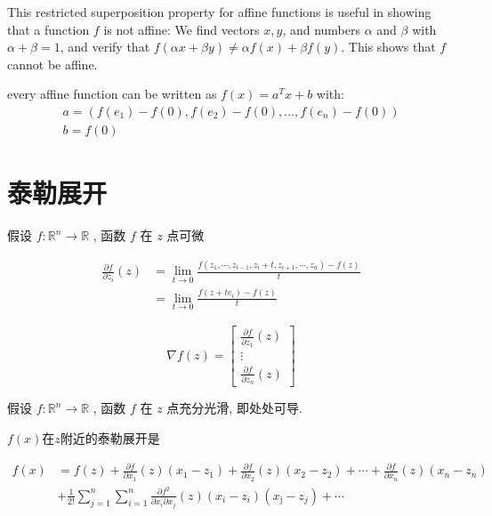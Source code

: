 \begin{corollary}
    This restricted superposition property for affine functions is useful in showing that a function $ f $ is not affine: We find vectors $ x, y $, and numbers $ \alpha $ and $ \beta $ with $ \alpha+\beta=1 $, and verify that $ f(\alpha x+\beta y) \neq \alpha f(x)+\beta f(y) . $ This shows that $ f $ cannot be affine.
\end{corollary}

\begin{theorem}
    every affine function can be written as $ f(x)=a^{T} x+b $ with:
$$
\begin{array}{l}
a=\left(f\left(e_{1}\right)-f(0), f\left(e_{2}\right)-f(0), \ldots, f\left(e_{n}\right)-f(0)\right) \\
b=f(0)
\end{array}
$$

\end{theorem}


\section{泰勒展开}

\begin{definition}[函数$f$第$i$个分量的一阶偏导数]
    假设 $ f: \mathbb{R}^{n} \rightarrow \mathbb{R} $ , 函数 $ f $ 在 $ z $ 点可微

    $$ \begin{aligned} \frac{\partial f}{\partial z_{i}}(z) &=\lim _{t \rightarrow 0} \frac{f\left(z_{1}, \cdots, z_{i-1}, z_{i}+t, z_{i+1}, \cdots, z_{n}\right)-f(z)}{t} \\ &=\lim _{t \rightarrow 0} \frac{f\left(z+t e_{i}\right)-f(z)}{t} \end{aligned} $$
\end{definition}

\begin{definition}[$f$在点$z$的梯度]
    $$ \nabla f(z)=\left[\begin{array}{c}\frac{\partial f}{\partial z_{1}}(z) \\ \vdots \\ \frac{\partial f}{\partial z_{n}}(z)\end{array}\right] $$
\end{definition}

\begin{definition}
    假设 $ f: \mathbb{R}^{n} \rightarrow \mathbb{R} $ , 函数 $ f $ 在 $ z $ 点充分光滑, 即处处可导.

    $f(x)$在$z$附近的泰勒展开是

    $$\begin{aligned} f(x)&=f(z)+\frac{\partial f}{\partial x_{1}}(z)\left(x_{1}-z_{1}\right)+\frac{\partial f}{\partial x_{2}}(z)\left(x_{2}-z_{2}\right)+\cdots+\frac{\partial f}{\partial x_{n}}(z)\left(x_{n}-z_{n}\right) 
    \\ & +\frac{1}{2 !} \sum_{j=1}^{n} \sum_{i=1}^{n} \frac{\partial f^{2}}{\partial x_{i} \partial x_{j}}(z)\left(x_{i}-z_{i}\right)\left(x_{\mathrm{j}}-z_{j}\right)+\cdots \end{aligned}$$
\end{definition}


